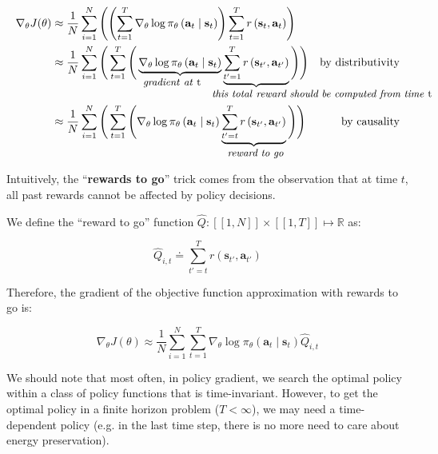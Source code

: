 \documentclass{article}
\begin{document}
\begin{subequations}
  \begin{align}
    \nabla_\theta J(\theta) 
      &\approx \frac{1}{N} \sum_{i=1}^N\left(\left(\sum_{t=1}^T\nabla_\theta\log\pi_\theta\left(\mathbf{a}_t\mid \mathbf{s}_t\right)\right) \sum_{t=1}^T r\left(\mathbf{s}_t,\mathbf{a}_t\right)\right)\\
      &\approx \frac{1}{N} \sum_{i=1}^N\Bigg(\sum_{t=1}^T\Bigg(\underbrace{\nabla_\theta\log\pi_\theta\left(\mathbf{a}_t\mid \mathbf{s}_t\right)}_{\small\llap{\textit{gradient}}\rlap{\textit{ at }t}} \underbrace{\sum_{t'=1}^T r\left(\mathbf{s}_{t'},\mathbf{a}_{t'}\right)}_{\small\llap{\textit{this total }}\rlap{\textit{reward should be computed from time }t}}\Bigg)\Bigg) &\text{by distributivity}\\
      &\approx \frac{1}{N} \sum_{i=1}^N\Bigg(\sum_{t=1}^T\Bigg(\nabla_\theta\log\pi_\theta\left(\mathbf{a}_t\mid \mathbf{s}_t\right) \underbrace{\sum_{t'=t}^T r\left(\mathbf{s}_{t'},\mathbf{a}_{t'}\right)}_{\textit{\small reward to go}}\Bigg)\Bigg) &\text{by causality}
  \end{align}
\end{subequations}

Intuitively, the ``\textbf{rewards to go}'' trick comes from the observation that at time $t$, all past rewards cannot be affected by policy decisions.

We define the ``reward to go'' function $\hat{Q}: \left[\!\left[1,N\right]\!\right] \times \left[\!\left[1,T\right]\!\right] \mapsto \mathbb{R}$ as:

\begin{equation}
  \hat{Q}_{i,t} \doteq \sum_{t'=t}^T r\left(\mathbf{s}_{t'},\mathbf{a}_{t'}\right)
\end{equation}

Therefore, the gradient of the objective function approximation with rewards to go is:

\begin{equation}
  \nabla_\theta J(\theta) \approx \frac{1}{N} \sum_{i=1}^N\sum_{t=1}^T\nabla_\theta\log\pi_\theta\left(\mathbf{a}_t\mid \mathbf{s}_t\right) \hat{Q}_{i,t}
\end{equation}

We should note that most often, in policy gradient, we search the optimal policy within a class of policy functions that is time-invariant. However, to get the optimal policy in a finite horizon problem ($T < \infty$), we may need a time-dependent policy (e.g. in the last time step, there is no more need to care about energy preservation).
\end{document}
